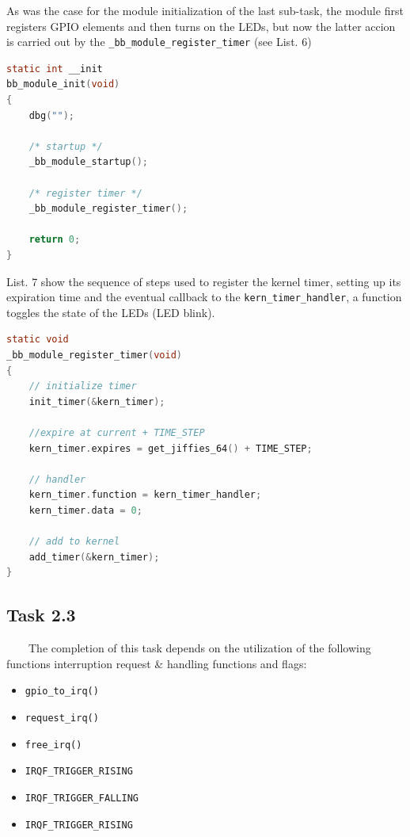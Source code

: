 \documentclass[letterpaper,12pt] {article}
\begin{document}
As was the case for the module initialization of the last sub-task, the module first registers GPIO elements and then turns on the LEDs, but now the latter accion is carried out by the \texttt{\_bb\_module\_register\_timer} (see List. 6)\\  

\begin{lstlisting}[firstnumber = 189 ,language=C , caption = Turn LEDs on kernel interrupt   ]
static int __init
bb_module_init(void)
{	
	dbg("");

	/* startup */
	_bb_module_startup();
	
	/* register timer */
	_bb_module_register_timer();
	
	return 0;
}
\end{lstlisting}

List. 7 show the sequence of steps used to register the kernel timer, setting up its expiration time and the eventual callback to the \texttt{kern\_timer\_handler}, a function toggles the state of the LEDs (LED blink).\\

\begin{lstlisting}[firstnumber = 138 ,language=C , caption =  Handling of the timer for kernel interrupts   ]
static void
_bb_module_register_timer(void)
{
	// initialize timer
	init_timer(&kern_timer);
	
	//expire at current + TIME_STEP
	kern_timer.expires = get_jiffies_64() + TIME_STEP;
	
	// handler
	kern_timer.function = kern_timer_handler;
	kern_timer.data = 0;
	
	// add to kernel
	add_timer(&kern_timer);
}
\end{lstlisting}

\subsection*{Task 2.3}
\ \ \ \
The completion of this task depends on the utilization of the following functions interruption request \& handling functions and flags:
\begin{multicols}{2}
		\begin{itemize}
			\item[] \texttt{gpio\_to\_irq()}
			\item[] \texttt{request\_irq()}
			\item[] \texttt{free\_irq()}
			\item[] \texttt{IRQF\_TRIGGER\_RISING}
			\item[] \texttt{IRQF\_TRIGGER\_FALLING}
			\item[] \texttt{IRQF\_TRIGGER\_RISING}
		\end{itemize}
\end{multicols}
\end{document}
